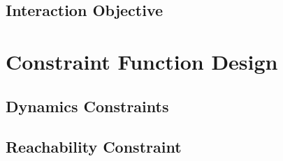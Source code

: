 
\subsection{Interaction Objective}
\label{text:approach/objective/interactive}


\section{Constraint Function Design}
\label{text:approach/constraint}

\subsection{Dynamics Constraints}
\label{text:approach/constraint/dynamics}


\subsection{Reachability Constraint}
\label{text:approach/constraint/reachability}


